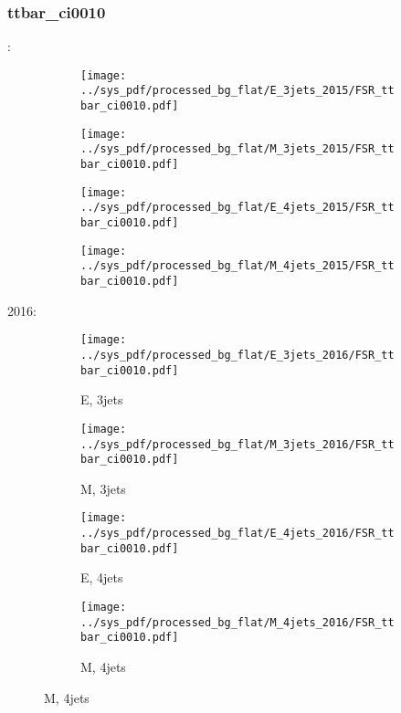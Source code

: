 \documentclass{beamer}
\begin{document}
\begin{frame}
\frametitle{ttbar_ci0010}
\fontsize{5}{1}:
\begin{figure}
\centering
\begin{subfigure}[b]{0.24\textwidth}
\texttt{[image: ../sys\_pdf/processed\_bg\_flat/E\_3jets\_2015/FSR\_ttbar\_ci0010.pdf]}
\end{subfigure}
\begin{subfigure}[b]{0.24\textwidth}
\texttt{[image: ../sys\_pdf/processed\_bg\_flat/M\_3jets\_2015/FSR\_ttbar\_ci0010.pdf]}
\end{subfigure}
\begin{subfigure}[b]{0.24\textwidth}
\texttt{[image: ../sys\_pdf/processed\_bg\_flat/E\_4jets\_2015/FSR\_ttbar\_ci0010.pdf]}
\end{subfigure}
\begin{subfigure}[b]{0.24\textwidth}
\texttt{[image: ../sys\_pdf/processed\_bg\_flat/M\_4jets\_2015/FSR\_ttbar\_ci0010.pdf]}
\end{subfigure}
\end{figure}
2016:
\begin{figure}
\centering
\begin{subfigure}[b]{0.24\textwidth}
\texttt{[image: ../sys\_pdf/processed\_bg\_flat/E\_3jets\_2016/FSR\_ttbar\_ci0010.pdf]}
\captionsetup{font=tiny}
\caption{E, 3jets}
\end{subfigure}
\begin{subfigure}[b]{0.24\textwidth}
\texttt{[image: ../sys\_pdf/processed\_bg\_flat/M\_3jets\_2016/FSR\_ttbar\_ci0010.pdf]}
\captionsetup{font=tiny}
\caption{M, 3jets}
\end{subfigure}
\begin{subfigure}[b]{0.24\textwidth}
\texttt{[image: ../sys\_pdf/processed\_bg\_flat/E\_4jets\_2016/FSR\_ttbar\_ci0010.pdf]}
\captionsetup{font=tiny}
\caption{E, 4jets}
\end{subfigure}
\begin{subfigure}[b]{0.24\textwidth}
\texttt{[image: ../sys\_pdf/processed\_bg\_flat/M\_4jets\_2016/FSR\_ttbar\_ci0010.pdf]}
\captionsetup{font=tiny}
\caption{M, 4jets}
\end{subfigure}
\end{figure}
\end{frame}
\end{document}
